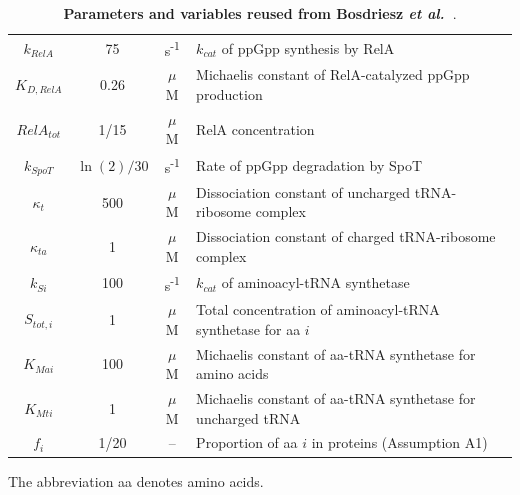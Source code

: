 \documentclass[a4paper,12pt]{article}
\begin{document}
\begin{table}[!h]
{\begin{tabular}{cccl}
$k_{RelA}$ & 75 & s\textsuperscript{-1} & $k_{cat}$ of ppGpp synthesis by RelA\\

$K_{D,RelA}$ & 0.26 & $\mu$M & Michaelis constant of RelA-catalyzed ppGpp production\\

$RelA_{tot}$ & 1/15 & $\mu$M & RelA concentration\\

$k_{SpoT}$ & $\ln (2) / 30$ & s\textsuperscript{-1} & Rate of ppGpp degradation by SpoT\\

$\kappa_t$ & 500 & $\mu$M & Dissociation constant of uncharged tRNA-ribosome complex\\

$\kappa_{ta}$ & 1 & $\mu$M & Dissociation constant of charged tRNA-ribosome complex\\

$k_{Si}$ & 100 & s\textsuperscript{-1} & $k_{cat}$ of aminoacyl-tRNA synthetase\\

$S_{tot,i}$ & 1 & $\mu$M & Total concentration of aminoacyl-tRNA synthetase for aa $i$\\

$K_{Mai}$ & 100 & $\mu$M & Michaelis constant of aa-tRNA synthetase for amino acids\\

$K_{Mti}$ & 1 & $\mu$M & Michaelis constant of aa-tRNA synthetase for uncharged tRNA\\

$f_i$ & 1/20 & -- & Proportion of aa $i$ in proteins (Assumption A1)\\

\end{tabular}
}
\caption{\textbf{Parameters and variables reused from Bosdriesz \textit{et al.}~\cite{bosdriesz_how_2015}}.} The abbreviation aa denotes amino acids.
\label{tab:notations}
\end{table}
\end{document}
